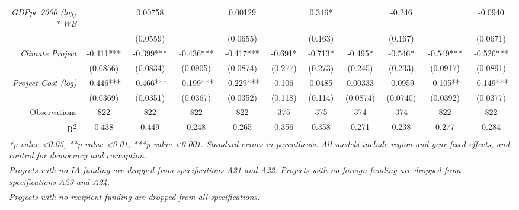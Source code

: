\documentclass{article}
\begin{document}
\begin{singlespace}
\begin{landscape}
\begin{table}[H]
{\begin{tabular}{rcccccccccc}
					\textit{GDPpc 2000 (log) * WB} &  & 0.00758 &  & 0.00129 &  & 0.346* &  & -0.246 &  & -0.0940 \\
					\textit{} &  & (0.0559) &  & (0.0655) &  & (0.163) &  & (0.167) &  & (0.0671) \\
					\textit{Climate Project} & -0.411*** & -0.399*** & -0.436*** & -0.417*** & -0.691* & -0.713* & -0.495* & -0.546* & -0.549*** & -0.526*** \\
					\textit{} & (0.0856) & (0.0834) & (0.0905) & (0.0874) & (0.277) & (0.273) & (0.245) & (0.233) & (0.0917) & (0.0891) \\
					\textit{Project Cost (log)} & -0.446*** & -0.466*** & -0.199*** & -0.229*** & 0.106 & 0.0485 & 0.00333 & -0.0959 & -0.105** & -0.149*** \\
					\textit{} & (0.0369) & (0.0351) & (0.0367) & (0.0352) & (0.118) & (0.114) & (0.0874) & (0.0740) & (0.0392) & (0.0377) \\ \hline
					Observations & 822 & 822 & 822 & 822 & 375 & 375 & 374 & 374 & 822 & 822 \\
					R\textsuperscript{2} & 0.438 & 0.449 & 0.248 & 0.265 & 0.356 & 0.358 & 0.271 & 0.238 & 0.277 & 0.284 \\ \hline
					\multicolumn{11}{l}{\textit{*p-value \textless 0.05, **p-value \textless 0.01, ***p-value \textless 0.001.  Standard errors in parenthesis. All models include region and year fixed effects, and control for democracy and corruption.}} \\
					\multicolumn{11}{l}{\textit{Projects with no IA funding are dropped from specifications A21 and A22.  Projects with no foreign funding are dropped from specifications A23 and A24.}} \\
					\multicolumn{11}{l}{\textit{Projects with no recipient funding are dropped from all specifications.}}
				\end{tabular}%
			}
		\end{table}
	\end{landscape}
\end{singlespace}
\end{document}
